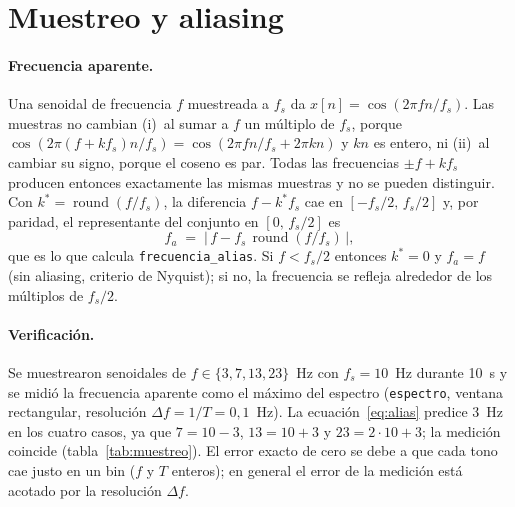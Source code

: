 %

\section{Muestreo y aliasing}
\label{sec:muestreo}

\paragraph{Frecuencia aparente.}
Una senoidal de frecuencia $f$ muestreada a $f_s$ da $x[n]=\cos(2\pi f n/f_s)$. Las muestras no cambian
(i)~al sumar a $f$ un múltiplo de $f_s$, porque $\cos(2\pi (f+kf_s)n/f_s)=\cos(2\pi fn/f_s+2\pi kn)$ y $kn$
es entero, ni (ii)~al cambiar su signo, porque el coseno es par. Todas las frecuencias $\pm f+kf_s$
producen entonces exactamente las mismas muestras y no se pueden distinguir. Con $k^\ast=\operatorname{round}(f/f_s)$,
la diferencia $f-k^\ast f_s$ cae en $[-f_s/2,\,f_s/2]$ y, por paridad, el representante del conjunto en
$[0,\,f_s/2]$ es
\begin{equation}
  f_a \;=\; \bigl|\,f - f_s\,\operatorname{round}(f/f_s)\,\bigr| ,
  \label{eq:alias}
\end{equation}
que es lo que calcula \texttt{frecuencia\_alias}. Si $f<f_s/2$ entonces $k^\ast=0$ y $f_a=f$ (sin aliasing,
criterio de Nyquist); si no, la frecuencia se refleja alrededor de los múltiplos de $f_s/2$.

\paragraph{Verificación.}
Se muestrearon senoidales de $f\in\{3,7,13,23\}$~Hz con $f_s=10$~Hz durante 10~s y se midió la frecuencia
aparente como el máximo del espectro (\texttt{espectro}, ventana rectangular, resolución
$\Delta f = 1/T = 0{,}1$~Hz). La ecuación~\eqref{eq:alias} predice 3~Hz en los cuatro casos, ya que
$7=10-3$, $13=10+3$ y $23=2\cdot10+3$; la medición coincide (tabla~\ref{tab:muestreo}). El error exacto
de cero se debe a que cada tono cae justo en un bin ($f$ y $T$ enteros); en general el error de la medición
está acotado por la resolución $\Delta f$.

